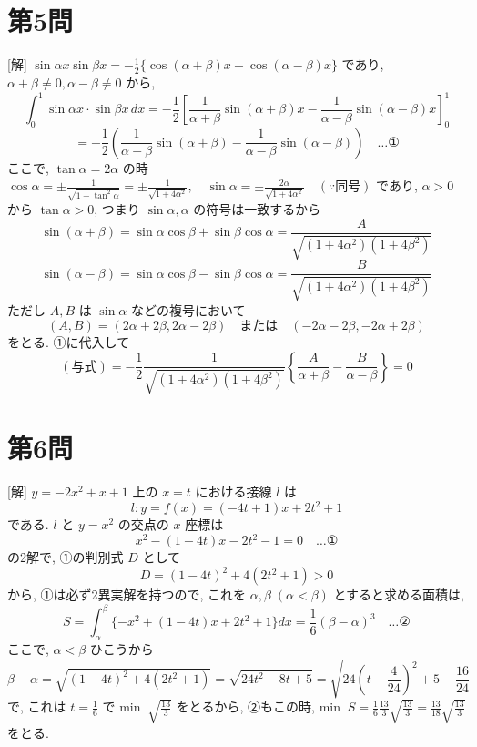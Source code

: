 \documentclass[../main.tex]{subfiles}
\begin{document}
\section*{第5問}

[解] $\sin\alpha x \sin\beta x = -\frac{1}{2} \{ \cos(\alpha+\beta)x - \cos(\alpha-\beta)x \}$ であり, $\alpha+\beta \neq 0, \alpha-\beta \neq 0$ から,
\[
  \int_0^1 \sin\alpha x \cdot \sin\beta x \, dx = -\frac{1}{2} \left[ \frac{1}{\alpha+\beta}\sin(\alpha+\beta)x - \frac{1}{\alpha-\beta}\sin(\alpha-\beta)x \right]_0^1
\]
\[
  = -\frac{1}{2} \left( \frac{1}{\alpha+\beta}\sin(\alpha+\beta) - \frac{1}{\alpha-\beta}\sin(\alpha-\beta) \right) \quad \dots \text{①}
\]
ここで, $\tan\alpha = 2\alpha$ の時 $\cos\alpha = \pm \frac{1}{\sqrt{1+\tan^2\alpha}} = \pm \frac{1}{\sqrt{1+4\alpha^2}}, \quad \sin\alpha = \pm \frac{2\alpha}{\sqrt{1+4\alpha^2}} \quad (\because \text{同号})$
であり, $\alpha > 0$ から $\tan\alpha > 0$, つまり $\sin\alpha, \alpha$ の符号は一致するから
\[
  \sin(\alpha+\beta) = \sin\alpha\cos\beta + \sin\beta\cos\alpha = \frac{A}{\sqrt{(1+4\alpha^2)(1+4\beta^2)}}
\]
\[
  \sin(\alpha-\beta) = \sin\alpha\cos\beta - \sin\beta\cos\alpha = \frac{B}{\sqrt{(1+4\alpha^2)(1+4\beta^2)}}
\]
ただし $A, B$ は $\sin\alpha$ などの複号において
\[
  (A, B) = (2\alpha+2\beta, 2\alpha-2\beta) \quad \text{または} \quad (-2\alpha-2\beta, -2\alpha+2\beta)
\]
をとる. ①に代入して
\[
  (\text{与式}) = -\frac{1}{2} \frac{1}{\sqrt{(1+4\alpha^2)(1+4\beta^2)}} \left\{ \frac{A}{\alpha+\beta} - \frac{B}{\alpha-\beta} \right\} = 0
\]

\section*{第6問}

[解] $y = -2x^2+x+1$ 上の $x=t$ における接線 $l$ は
\[
  l : y = f(x) = (-4t+1)x + 2t^2+1
\]
である. $l$ と $y = x^2$ の交点の $x$ 座標は
\[
  x^2 - (1-4t)x - 2t^2 - 1 = 0 \quad \dots \text{①}
\]
の2解で, ①の判別式 $D$ として
\[
  D = (1-4t)^2 + 4(2t^2+1) > 0
\]
から, ①は必ず2異実解を持つので, これを $\alpha, \beta \; (\alpha < \beta)$ とすると求める面積は,
\[
  S = \int_{\alpha}^{\beta} \{ -x^2 + (1-4t)x + 2t^2+1 \} dx = \frac{1}{6}(\beta-\alpha)^3 \quad \dots \text{②}
\]
ここで, $\alpha < \beta$ ひこうから
\[
  \beta - \alpha = \sqrt{(1-4t)^2 + 4(2t^2+1)} = \sqrt{24t^2-8t+5} = \sqrt{24\left(t - \frac{4}{24}\right)^2 + 5 - \frac{16}{24}}
\]
で, これは $t = \frac{1}{6}$ で $\text{min} \;\; \sqrt{\frac{13}{3}}$ をとるから, ②もこの時, $\text{min} \;\; S = \frac{1}{6} \frac{13}{3} \sqrt{\frac{13}{3}} = \frac{13}{18} \sqrt{\frac{13}{3}}$ をとる.
\end{document}
